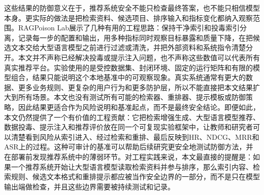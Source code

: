 这些结果的防御意义在于，推荐系统安全不能只检查最终答案，也不能只相信模型本身。更实际的做法是把检索资料、候选项目、排序输入和指标变化都纳入观察范围。RAGPoison Lab展示了几种有用的工程思路：保持干净索引和投毒索引分离，记录每一步的配置和输出，用多种指标同时观察目标暴露和质量下降，在把候选文本交给大型语言模型之前进行过滤或清洗，并把外部资料和系统指令清楚分开。本文并不声称已经解决投毒或提示注入问题，也不声称这些数值可以代表所有真实推荐平台。实验使用的是受控数据集、封闭环境、固定的运行矩阵和有限的模型组合，结果只能说明这个本地基准中的可观察现象。真实系统通常有更大的数据、更多业务规则、更复杂的用户行为和更多防护层，所以不能直接把本文结果扩大到所有场景。本文也没有测试所有可能的检索器、重排器、提示模板或防御策略，因此结果更适合作为风险说明和基准起点，而不是最终安全结论。即便如此，本文仍然提供了一个有价值的工程贡献：它把检索增强生成、大型语言模型推荐、数据投毒、提示注入和推荐评价放在同一个可复现实验框架中，让教师和研究者可以清楚看到风险从索引进入、经过检索和重排、最后反映到HR、NDCG、MRR和ASR上的过程。这种可审计的基准可以帮助后续研究更安全地测试防御方法，并在部署前发现推荐系统中的薄弱环节。对工程实践来说，本文最直接的提醒是：如果一个推荐系统开始让大型语言模型读取检索资料并参与排序，那么索引内容、检索规则、候选文本格式和重排提示都应被当作安全边界的一部分，而不是只在模型输出端做检查，并且这些边界需要被持续测试和记录。
